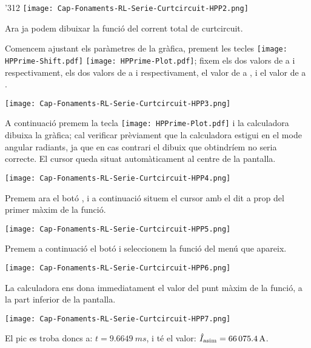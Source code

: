 \begin{exemple}
\begin{dingautolist}{'312}
            \texttt{[image: Cap-Fonaments-RL-Serie-Curtcircuit-HPP2.png]}

        \item Ara ja podem dibuixar la funció del corrent total de curtcircuit.

            Comencem ajustant els paràmetres de la gràfica, prement les tecles \texttt{[image: HPPrime-Shift.pdf]} \texttt{[image: HPPrime-Plot.pdf]}; fixem els dos valors de  a  i  respectivament, els dos valors de  a  i  respectivament, el valor de  a , i el valor de  a .

            \texttt{[image: Cap-Fonaments-RL-Serie-Curtcircuit-HPP3.png]}
            \break

        \item A continuació premem la tecla \texttt{[image: HPPrime-Plot.pdf]} i la calculadora dibuixa la gràfica; cal verificar prèviament que la calculadora estigui en el mode angular radiants, ja que en cas contrari el dibuix que obtindríem no seria correcte. El cursor queda situat automàticament al centre de la pantalla.

            \texttt{[image: Cap-Fonaments-RL-Serie-Curtcircuit-HPP4.png]}

        \item Premem ara el botó , i a continuació situem el cursor amb el dit a prop del primer màxim de la funció.

            \texttt{[image: Cap-Fonaments-RL-Serie-Curtcircuit-HPP5.png]}

        \item Premem a continuació el botó  i seleccionem la funció  del menú que apareix.

            \texttt{[image: Cap-Fonaments-RL-Serie-Curtcircuit-HPP6.png]}

        \item La calculadora ens dona immediatament el valor del punt màxim de la funció, a la part inferior de la pantalla.

            \texttt{[image: Cap-Fonaments-RL-Serie-Curtcircuit-HPP7.png]}

            El pic es troba doncs a: $t=\SI{9,6649}{ms}$, i té el valor:  $\hat{I}_\mathrm{asim}=\SI{66075,4}{A}$.
    \end{dingautolist}

\end{exemple}


